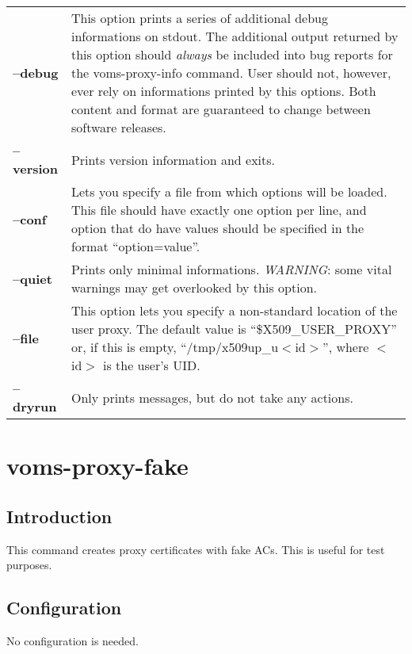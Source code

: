 \documentclass[a4paper]{book}
\begin{document}
\begin{longtable}{lp{3in}}
\textbf{--debug}    & This option prints a series of additional debug
		      informations on stdout.  The additional output
		      returned by this option should \emph{always} be
		      included into bug reports for the
		      voms-proxy-info command.  User should not,
		      however, ever rely on informations printed by
		      this options.  Both content and format are
		      guaranteed to change between software
		      releases.\\
\textbf{--version}  & Prints version information and exits.\\
\textbf{--conf}     & Lets you specify a file from which options will
		      be loaded.  This file should have exactly one
		      option per line, and option that do have values
		      should be specified in the format
		      ``option=value''.\\ 
\textbf{--quiet}    & Prints only minimal informations.
		      \emph{WARNING}: some vital warnings may get
		      overlooked by this option.\\
\textbf{--file}     & This option lets you specify a non-standard
		      location of the user proxy.  The default value
		      is ``\$X509\_USER\_PROXY'' or, if this is empty,
		      ``/tmp/x509up\_u$<$id$>$'', where $<$id$>$ is
		      the user's UID.\\
\textbf{--dryrun}   & Only prints messages, but do not take any
		      actions.\\
\end{longtable}

\chapter{voms-proxy-fake}
\section{Introduction}
This command creates proxy certificates with fake ACs.  This is useful for test
purposes.

\section{Configuration}
No configuration is needed.
\end{document}
